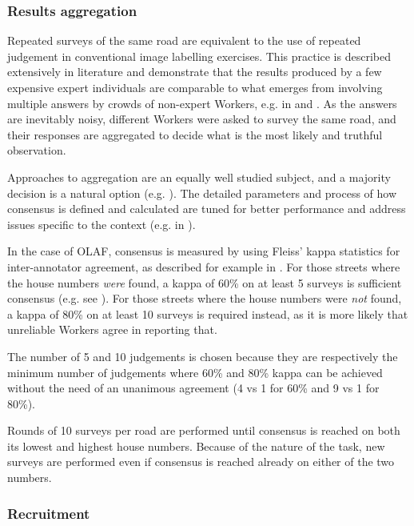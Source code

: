 \subsubsection{Results aggregation}

Repeated surveys of the same road are equivalent to the use of repeated judgement in conventional image labelling exercises. This practice is described extensively in literature and demonstrate that the results produced by a few expensive expert individuals are comparable to what emerges from involving multiple answers by crowds of non-expert Workers, e.g. in \cite{Snow:2008wo} and \cite{Sheng:2008gra}. As the answers are inevitably noisy, different Workers were asked to survey the same road, and their responses are aggregated to decide what is the most likely and truthful observation. 
        
Approaches to aggregation are an equally well studied subject, and a majority decision is a natural option (e.g. \cite{Le:2010ug}). The detailed parameters and process of how consensus is defined and calculated are tuned for better performance and address issues specific to the context (e.g. in \cite{Hirth:2011fh}). 

In the case of OLAF, consensus is measured by using Fleiss' kappa statistics for inter-annotator agreement, as described for example in \cite{Nowak:2010gt}. For those streets where the house numbers {\it were} found, a kappa of 60\% on at least 5 surveys is sufficient consensus (e.g. see \cite{Landis:1977kv}). For those streets where the house numbers were {\it not} found, a kappa of 80\% on at least 10 surveys is required instead, as it is more likely that unreliable Workers agree in reporting that.

The number of 5 and 10 judgements is chosen because they are respectively the minimum number of judgements where 60\% and 80\% kappa can be achieved without the need of an unanimous agreement (4 vs 1 for 60\% and 9 vs 1 for 80\%). 

Rounds of 10 surveys per road are performed until consensus is reached on both its lowest and highest house numbers. Because of the nature of the task, new surveys are performed even if consensus is reached already on either of the two numbers.  
\subsubsection{Recruitment}

